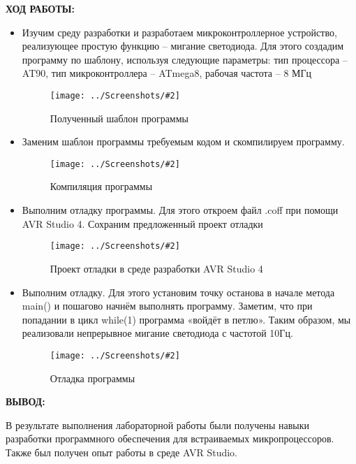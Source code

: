 \documentclass[14pt,a4paper]{extreport}
\newcommand{\sshot}[2]{\begin{figure}[ht]%
\centering\texttt{[image: ../Screenshots/\#2]}%
\caption{#1}%
\label{sshot#2}%
\end{figure}%
}
\newcommand{\header}[1]{%
{
\clearpage%
\fontsize{16pt}{14pt}\selectfont
\begin{center}
\textbf{\MakeUppercase{#1}:}
\end{center}
}
}
\begin{document}
\header{Ход работы}

\begin{itemize}

\item Изучим среду разработки и разработаем микроконтроллерное устройство, реализующее простую функцию – мигание светодиода. Для этого создадим программу по шаблону, используя следующие параметры: тип процессора – AT90, тип микроконтроллера – ATmega8, рабочая частота – 8 МГц

\sshot{Полученный шаблон программы}{1}

\item Заменим шаблон программы требуемым кодом и скомпилируем программу. 

\sshot{Компиляция программы}{2}

\clearpage

\item Выполним отладку программы. Для этого откроем файл .coff при помощи AVR Studio 4. Сохраним предложенный проект отладки

\sshot{Проект отладки в среде разработки AVR Studio 4}{3}

\item Выполним отладку. Для этого установим точку останова в начале метода main() и пошагово начнём выполнять программу. Заметим, что при попадании в цикл while(1) программа «войдёт в петлю». Таким образом, мы реализовали непрерывное мигание светодиода с частотой 10Гц.

\sshot{Отладка программы}{4}

\end{itemize}

\header{Вывод}

	В результате выполнения лабораторной работы были получены навыки разработки программного обеспечения для встраиваемых микропроцессоров. Также был получен опыт работы в среде AVR Studio.
\end{document}

